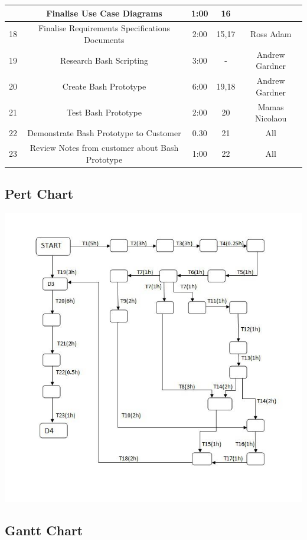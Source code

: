 \documentclass{l3deliverable}
\begin{document}
{\begin{table}
\begin{tabular}{|c |c |c |c |c |}
 & Finalise Use Case Diagrams &1:00  &16 & \\
\hline18 & Finalise Requirements Specifications Documents & 2:00 &15,17& Ross Adam \\
\hline19 & Research Bash Scripting & 3:00 &-&Andrew Gardner\\
\hline20 & Create Bash Prototype & 6:00 &19,18&Andrew Gardner \\
\hline21 & Test Bash Prototype & 2:00 &20& Mamas Nicolaou \\
\hline22 & Demonstrate Bash Prototype to Customer & 0.30 &21& All\\     
\hline23 & Review Notes from customer about Bash Prototype & 1:00 &22& All\\      
\hline %
\end{tabular}
\label{table:nonlin} %
\end{table}
\pagebreak

\subsection{Pert Chart}
\includegraphics[scale=0.7]{img/PERT.jpg}

\subsection{Gantt Chart}

}
\end{document}
